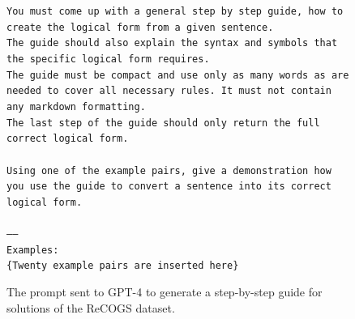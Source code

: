 \documentclass[11pt]{article}
\begin{document}
    \begin{figure}
        \small
        \texttt{You must come up with a general step by step guide, how to create the logical form from a given sentence.\\
        The guide should also explain the syntax and symbols that the specific logical form requires.\\
        The guide must be compact and use only as many words as are needed to cover all necessary rules. It must not contain any markdown formatting.\\
        The last step of the guide should only return the full correct logical form.\\
        \\
        Using one of the example pairs, give a demonstration how you use the guide to convert a sentence into its correct logical form.\\
        \\
        -----\\
        Examples:\\
        {\color{red}\{Twenty example pairs are inserted here\}}
        }
        \caption{The prompt sent to GPT-4 to generate a step-by-step guide for solutions of the ReCOGS dataset.}
        \label{fig:guide_prompt}
    \end{figure}
\end{document}
